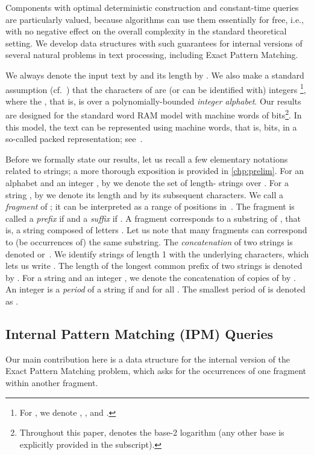 \documentclass[a4paper]{article}
\theoremstyle{definition}
\theoremstyle{remark}
\begin{document}
Components with optimal deterministic construction and constant-time queries are particularly valued,
because algorithms can use them essentially for free,
i.e., with no negative effect on the overall complexity in the standard theoretical setting.
We develop data structures with such guarantees for internal versions of several natural problems in text processing, including Exact Pattern Matching.

We always denote the input text by  and its length by .
We also make a standard assumption (cf.\ \cite{DBLP:journals/jacm/Farach-ColtonFM00}) that the characters of  are (or can be identified with) integers 
\footnote{ For , we
denote , , and . },
where the , that is,  is over a polynomially-bounded \emph{integer alphabet}.
Our results are designed for the standard word RAM model with machine words of  bits\footnote{Throughout this paper,  denotes the base-2 logarithm (any other base is explicitly provided in the subscript).}.
In this model, the text  can be represented using  machine words, that is,  bits, in a
so-called packed representation; see~\cite{DBLP:journals/tcs/Ben-KikiBBGGW14}.

Before we formally state our results, let us recall a few elementary notations related to strings;
a more thorough exposition is provided in \cref{chp:prelim}.
For an alphabet  and an integer , by  we denote the set of length- strings over .
For a string , by  we denote its length and by  its subsequent characters.
We call  a \emph{fragment} of ; it can be interpreted as a range  of positions in~.
The fragment is called a \emph{prefix} if  and a \emph{suffix} if .
A fragment  corresponds to a substring of , that is, a string composed of letters .
Let us note that many fragments can correspond to (be occurrences of) the same substring.
The \emph{concatenation} of two strings  is denoted  or~.
We identify strings of length 1 with the underlying characters, which lets us write .
The length of the longest common prefix of two strings  is denoted by .
For a string  and an integer , we denote the concatenation of  copies of  by .
An integer  is a \emph{period} of a string  if  and  for all .
The smallest period of  is denoted as .

\subsection{Internal Pattern Matching (IPM) Queries}
Our main contribution here is a data structure
for the internal version of the Exact Pattern Matching problem,
which asks for the occurrences of one fragment within another fragment.
\end{document}
